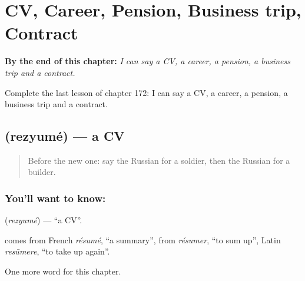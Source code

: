 
\chapter{CV, Career, Pension, Business trip, Contract}
\label{ch:ru-cv-career-pension-business-trip-contract}

\begin{chapteropening}
\textbf{By the end of this chapter:} \emph{I can say a CV, a career, a pension, a business trip and a contract.}

Complete the last lesson of chapter 172: I can say a CV, a career, a pension, a business trip and a contract.
\end{chapteropening}

\section[\texorpdfstring{\ru{резюме} (rezyumé)}{резюме (rezyumé)}]{ (rezyumé) — a CV}

\label{lesson:RU-C172-rezyume}



\begin{quote}
Before the new one: say the Russian for a soldier, then the Russian for a builder.
\end{quote}

\subsection*{You'll want to know: }
\textbf{} (\emph{rezyumé}) — \textquotedblleft{}a CV\textquotedblright{}.

\begin{cousinweb}
\textbf{} comes from French \emph{résumé}, \textquotedblleft{}a summary\textquotedblright{}, from \emph{résumer}, \textquotedblleft{}to sum up\textquotedblright{}, Latin \emph{resūmere}, \textquotedblleft{}to take up again\textquotedblright{}.
\end{cousinweb}

\begin{grammarlens}[title={What you've built}]
One more word for this chapter.
\end{grammarlens}

